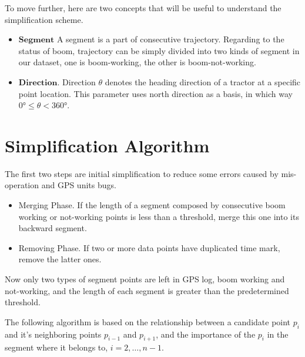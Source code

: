 To move further, here are two concepts that will be useful to understand the simplification scheme.
\begin{itemize}
\item $\mathbf{Segment}$ A segment is a part of consecutive trajectory. Regarding to the status of boom, trajectory can be simply divided into two kinds of segment in our dataset, one is boom-working, the other is boom-not-working. 
\item $\mathbf{Direction}$. Direction $\theta$ denotes the heading direction of a tractor at a specific point location. This parameter uses north direction as a basis, in which way $\ang{0} \leq \theta < \ang{360}$.
\end{itemize}



\section{Simplification Algorithm}

The first two steps are initial simplification to reduce some errors caused by mis-operation and GPS units bugs.
\begin{itemize}
\item Merging Phase. If the length of a segment composed by consecutive boom working or not-working points is less than a threshold, merge this one into its backward segment. 
\item Removing Phase. If two or more data points have duplicated time mark, remove the latter ones. 
\end{itemize}
Now only two types of segment points are left in GPS log, boom working and not-working, and the length of each segment is greater than the predetermined threshold.

The following algorithm is based on the relationship between a candidate point $p_i$ and it's neighboring points $p_{i-1}$ and $p_{i+1}$, and the importance of the $p_i$ in the segment where it belongs to, $i=2,\ldots,n-1$. 

